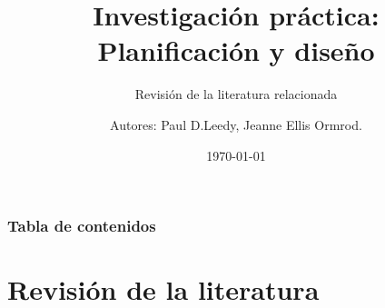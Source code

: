 \documentclass{beamer}
\begin{document}
\title{Investigaci\'on pr\'actica: Planificaci\'on y dise\~no} 
\subtitle{Revisi\'on de la literatura relacionada}   
\author{Autores: Paul D.Leedy, Jeanne Ellis Ormrod.}
\date{\today} 


\begin{frame}
\titlepage
\end{frame}

\begin{frame}
\frametitle{Tabla de contenidos}  
    \tableofcontents[hideallsubsections]
\end{frame} 


\section{Revisi\'on de la literatura} %
\end{document}
